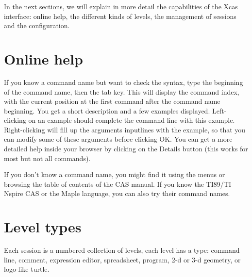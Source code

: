 \documentclass{article}
\begin{document}
In the next sections, we will explain in more detail the
capabilities of the Xcas interface: online help,
the different kinds of levels,
the management of sessions and the configuration.

\section{Online help}
If you know a command name but want to check the syntax, type the 
beginning of the command name, then the tab key.  This will
display the command index, with the current position at the first
command after the command name beginning.  You get a short description
and a few examples displayed.  Left-clicking on an example should
complete the command line with this example. Right-clicking will
fill up the arguments inputlines with the example, so that you
can modify some of these arguments before clicking OK.
You can get a more detailed help inside your browser 
by clicking on the Details button (this works for most but not all commands).

If you don't know a command name, you might find it using the
menus or browsing the table of contents of the CAS manual. If you
know the TI89/TI Nspire CAS or the Maple language, you can 
also try their command names.

\section{Level types}
Each session is a numbered collection of levels, each level 
has a type: command line, comment, expression editor,
spreadsheet, program, 2-d or
3-d geometry, or logo-like turtle.
\end{document}
